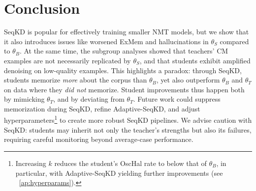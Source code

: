 \section{Conclusion}
\label{sec:conclusion}

SeqKD is popular for effectively training smaller NMT models, but we show that it also introduces issues like worsened ExMem and hallucinations in $\theta_S$ compared to $\theta_B$.
At the same time, the subgroup analyses showed that teachers' CM examples are not necessarily replicated by $\theta_S$, and that students exhibit amplified denoising on low-quality examples.
This highlights a paradox: through SeqKD, students memorize \textit{more} about the corpus than $\theta_B$, yet also outperform $\theta_B$ and $\theta_T$ on data where they \textit{did not} memorize.
Student improvements thus happen both by mimicking $\theta_T$, and by deviating from $\theta_T$.
Future work could suppress memorization during SeqKD, refine Adaptive-SeqKD, and adjust hyperparameters\footnote{Increasing $k$ reduces the student's OscHal rate to below that of $\theta_B$, in particular, with Adaptive-SeqKD yielding further improvements (see \appendixshortcut~\ref{ap:hyperparams}).}
to create more robust SeqKD pipelines.
We advise caution with SeqKD: students may inherit not only the teacher's strengths but also its failures, requiring careful monitoring beyond average-case performance.